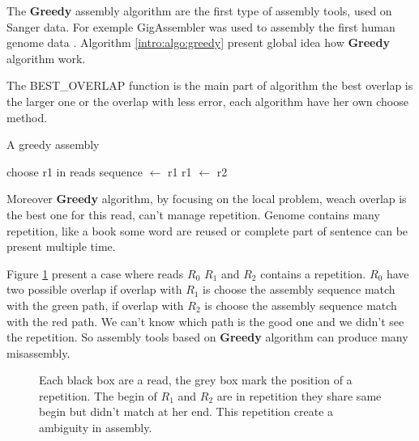 \documentclass[./main.tex]{subfiles}
\begin{document}
The \textbf{Greedy} assembly algorithm are the first type of assembly tools, used on Sanger data. For exemple GigAssembler was used to assembly the first human genome data \cite{GigAssembler}. Algorithm \ref{intro:algo:greedy} present global idea how \textbf{Greedy} algorithm work.

The BEST\_OVERLAP function is the main part of algorithm the best overlap is the larger one or the overlap with less error, each algorithm have her own choose method.

\begin{algorithm}[ht]
    \caption{A greedy assembly}
    \begin{algorithmic}[1]
        \State choose r1 in reads
        \State sequence $\leftarrow$ r1
            \State {}
            \State {}
            \State r1 $\leftarrow$ r2
        \EndWhile
    \EndFunction
    \end{algorithmic}
    \label{intro:algo:greedy}
\end{algorithm}

Moreover \textbf{Greedy} algorithm, by focusing on the local problem, weach overlap is the best one for this read, can't manage repetition. Genome contains many repetition, like a book some word are reused or complete part of sentence can be present multiple time.

Figure \ref{intro:fig:greedy:repetition} present a case where reads $R_0$ $R_1$ and $R_2$ contains a repetition. $R_0$ have two possible overlap if overlap with $R_1$ is choose the assembly sequence match with the green path, if overlap with $R_2$ is choose the assembly sequence match with the red path. We can't know which path is the good one and we didn't see the repetition. So assembly tools based on \textbf{Greedy} algorithm can produce many misassembly. 

\begin{figure}[ht]
    \centering 
    
    \caption{Each black box are a read, the grey box mark the position of a repetition. The begin of $R_1$ and $R_2$ are in repetition they share same begin but didn't match at her end. This repetition create a ambiguity in assembly.}
    \label{intro:fig:greedy:repetition}
\end{figure}
\end{document}

